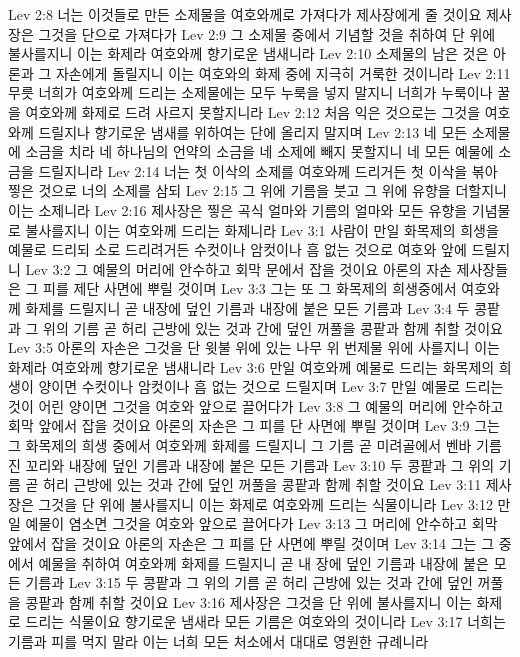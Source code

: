 Lev 2:8  너는 이것들로 만든 소제물을 여호와께로 가져다가 제사장에게 줄 것이요 제사장은 그것을 단으로 가져다가
Lev 2:9  그 소제물 중에서 기념할 것을 취하여 단 위에 불사를지니 이는 화제라 여호와께 향기로운 냄새니라
Lev 2:10  소제물의 남은 것은 아론과 그 자손에게 돌릴지니 이는 여호와의 화제 중에 지극히 거룩한 것이니라
Lev 2:11  무릇 너희가 여호와께 드리는 소제물에는 모두 누룩을 넣지 말지니 너희가 누룩이나 꿀을 여호와께 화제로 드려 사르지 못할지니라
Lev 2:12  처음 익은 것으로는 그것을 여호와께 드릴지나 향기로운 냄새를 위하여는 단에 올리지 말지며
Lev 2:13  네 모든 소제물에 소금을 치라 네 하나님의 언약의 소금을 네 소제에 빼지 못할지니 네 모든 예물에 소금을 드릴지니라
Lev 2:14  너는 첫 이삭의 소제를 여호와께 드리거든 첫 이삭을 볶아 찧은 것으로 너의 소제를 삼되
Lev 2:15  그 위에 기름을 붓고 그 위에 유향을 더할지니 이는 소제니라
Lev 2:16  제사장은 찧은 곡식 얼마와 기름의 얼마와 모든 유향을 기념물로 불사를지니 이는 여호와께 드리는 화제니라
Lev 3:1  사람이 만일 화목제의 희생을 예물로 드리되 소로 드리려거든 수컷이나 암컷이나 흠 없는 것으로 여호와 앞에 드릴지니
Lev 3:2  그 예물의 머리에 안수하고 회막 문에서 잡을 것이요 아론의 자손 제사장들은 그 피를 제단 사면에 뿌릴 것이며
Lev 3:3  그는 또 그 화목제의 희생중에서 여호와께 화제를 드릴지니 곧 내장에 덮인 기름과 내장에 붙은 모든 기름과
Lev 3:4  두 콩팥과 그 위의 기름 곧 허리 근방에 있는 것과 간에 덮인 꺼풀을 콩팥과 함께 취할 것이요
Lev 3:5  아론의 자손은 그것을 단 윗불 위에 있는 나무 위 번제물 위에 사를지니 이는 화제라 여호와께 향기로운 냄새니라
Lev 3:6  만일 여호와께 예물로 드리는 화목제의 희생이 양이면 수컷이나 암컷이나 흠 없는 것으로 드릴지며
Lev 3:7  만일 예물로 드리는 것이 어린 양이면 그것을 여호와 앞으로 끌어다가
Lev 3:8  그 예물의 머리에 안수하고 회막 앞에서 잡을 것이요 아론의 자손은 그 피를 단 사면에 뿌릴 것이며
Lev 3:9  그는 그 화목제의 희생 중에서 여호와께 화제를 드릴지니 그 기름 곧 미려골에서 벤바 기름진 꼬리와 내장에 덮인 기름과 내장에 붙은 모든 기름과
Lev 3:10  두 콩팥과 그 위의 기름 곧 허리 근방에 있는 것과 간에 덮인 꺼풀을 콩팥과 함께 취할 것이요
Lev 3:11  제사장은 그것을 단 위에 불사를지니 이는 화제로 여호와께 드리는 식물이니라
Lev 3:12  만일 예물이 염소면 그것을 여호와 앞으로 끌어다가
Lev 3:13  그 머리에 안수하고 회막 앞에서 잡을 것이요 아론의 자손은 그 피를 단 사면에 뿌릴 것이며
Lev 3:14  그는 그 중에서 예물을 취하여 여호와께 화제를 드릴지니 곧 내 장에 덮인 기름과 내장에 붙은 모든 기름과
Lev 3:15  두 콩팥과 그 위의 기름 곧 허리 근방에 있는 것과 간에 덮인 꺼풀을 콩팥과 함께 취할 것이요
Lev 3:16  제사장은 그것을 단 위에 불사를지니 이는 화제로 드리는 식물이요 향기로운 냄새라 모든 기름은 여호와의 것이니라
Lev 3:17  너희는 기름과 피를 먹지 말라 이는 너희 모든 처소에서 대대로 영원한 규례니라
